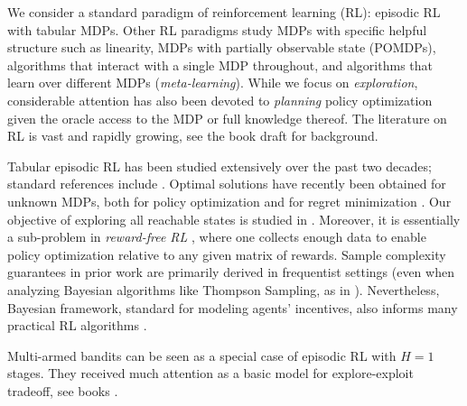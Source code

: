 

We consider a standard paradigm of reinforcement learning (RL): episodic RL with tabular MDPs. Other RL paradigms study MDPs with specific helpful structure such as linearity, MDPs with partially observable state (POMDPs), algorithms that interact with a single MDP throughout, and algorithms that learn over different MDPs (\emph{meta-learning}). While we focus on \emph{exploration}, considerable attention has also been devoted to \emph{planning}
\ie policy optimization given the oracle access to the MDP or full knowledge thereof. The literature on RL is vast and rapidly growing, see the book draft \citep{RLTheoryBook-20} for background.

Tabular episodic RL has been studied extensively over the past two decades; standard references include
\cite{kakade2003sample,kearns2002near,brafman2002r,strehl2006pac,strehl2009reinforcement}.
Optimal solutions have recently been obtained for unknown MDPs, both for policy optimization \citep{dann2017unifying} and for regret minimization \citep{jaksch2010near,azar2017minimax,dann2015sample}.
Our objective of exploring all reachable states is studied in \citep{kearns2002near,brafman2002r}. Moreover, it is essentially a sub-problem in \emph{reward-free RL} \citep{jin2020reward}, where one collects enough data to enable policy optimization relative to any given matrix of rewards. Sample complexity guarantees in prior work are primarily derived in frequentist settings (even when analyzing Bayesian algorithms like Thompson Sampling, as in \citet{pmlr-v40-Gopalan15}). Nevertheless, Bayesian framework, standard for modeling agents' incentives, also informs many practical RL algorithms \citep{ghavamzadeh2016bayesian}.

Multi-armed bandits can be seen as a special case of episodic RL with $H=1$ stages. They received much attention as a basic model for explore-exploit tradeoff, \eg see books \citep{Gittins-book11,Bubeck-survey12,slivkins-MABbook,LS19bandit-book}.





